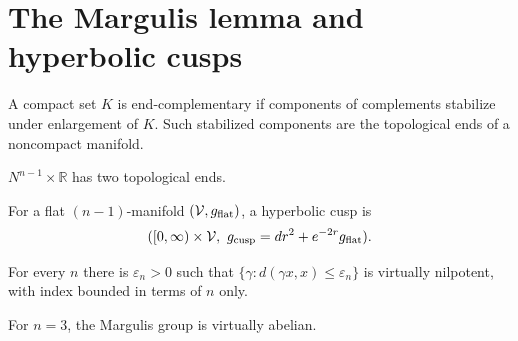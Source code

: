 \section{The Margulis lemma and hyperbolic cusps}

\begin{definition}
\label{def:chow-iv-topological-end}

A compact set \(K\) is end-complementary if components of complements stabilize
under enlargement of \(K\).  Such stabilized components are the topological
ends of a noncompact manifold.
\end{definition}

\begin{example}[Cylinder]
\label{ex:chow-iv-cylinder-ends}

\(N^{n-1}\times\mathbb R\) has two topological ends.
\end{example}

\begin{definition}
\label{def:chow-iv-hyperbolic-cusp}

For a flat \((n-1)\)-manifold \((\mathcal V,g_{\rm flat})\), a hyperbolic cusp is
\[
([0,\infty)\times\mathcal V,\ g_{\rm cusp}=dr^2+e^{-2r}g_{\rm flat}).
\]
\end{definition}

\begin{theorem}
\label{thm:chow-iv-margulis-algebraic}

For every \(n\) there is \(\varepsilon_n>0\) such that
\(\{\gamma:d(\gamma x,x)\le\varepsilon_n\}\) is virtually nilpotent, with
index bounded in terms of \(n\) only.
\end{theorem}

\begin{remark}
\label{rem:chow-iv-margulis-three-dimensional}

For \(n=3\), the Margulis group is virtually abelian.
\end{remark}

